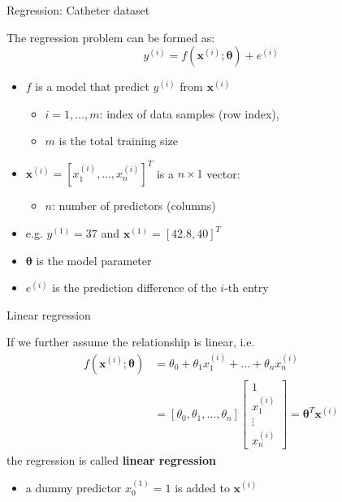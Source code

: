 \documentclass[ignorenonframetext,]{beamer}
\providecommand{\tightlist}{%
  \setlength{\itemsep}{0pt}\setlength{\parskip}{0pt}}
\newcommand{\vv}[1]{\boldsymbol{#1}}
\begin{document}
\begin{frame}{Regression: Catheter dataset}
\protect\hypertarget{regression-catheter-dataset-1}{}

The regression problem can be formed as:
\[y^{(i)} =f(\vv{x}^{(i)}; \vv{\theta}) + e^{(i)}\]

\begin{itemize}
\tightlist
\item
  \(f\) is a model that predict \(y^{(i)}\) from \(\vv{x}^{(i)}\)

  \begin{itemize}
  \tightlist
  \item
    \(i = 1,\ldots,m\): index of data samples (row index),
  \item
    \(m\) is the total training size
  \end{itemize}
\item
  \(\vv{x}^{(i)} = [x_{1}^{(i)}, \ldots, x^{(i)}_n]^T\) is a
  \(n\times 1\) vector:

  \begin{itemize}
  \tightlist
  \item
    \(n\): number of predictors (columns)
  \end{itemize}
\item
  e.g. \(y^{(1)} = 37\) and \(\vv{x}^{(1)} = [42.8, 40]^T\)
\item
  \(\vv{\theta}\) is the model parameter
\item
  \(e^{(i)}\) is the prediction difference of the \(i\)-th entry
\end{itemize}

\end{frame}

\begin{frame}{Linear regression}
\protect\hypertarget{linear-regression}{}

If we further assume the relationship is linear, i.e. \begin{align*}
f(\vv{x}^{(i)}; \vv{\theta}) &= \theta_0 + \theta_1  x^{(i)}_{1} + \ldots +\theta_{n} x^{(i)}_n \\
&= [\theta_0, \theta_1, \ldots, \theta_n] \begin{bmatrix}1\\ x^{(i)}_1\\ \vdots\\ x^{(i)}_n\end{bmatrix} = \vv{\theta}^T\vv{x}^{(i)}
\end{align*} the regression is called \textbf{linear regression}

\bigskip

\begin{itemize}
\tightlist
\item
  a dummy predictor \(x_0^{(1)}=1\) is added to \(\vv{x}^{(i)}\)
\end{itemize}

\end{frame}
\end{document}
